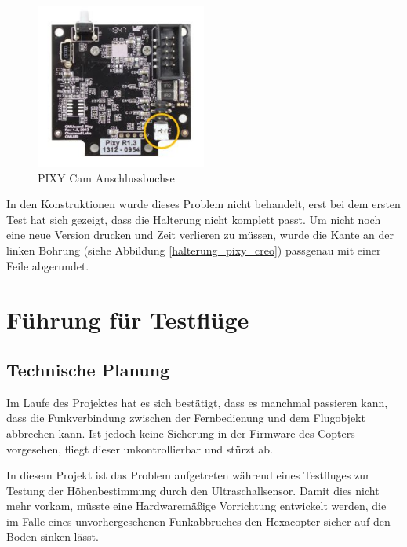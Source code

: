 			\begin{figure}[H]
			\begin{centering}
			\includegraphics[width = 0.5\textwidth]{Bilder/PIXY_Cam_Hinterseite}
			\par\end{centering}
			\caption[PIXY Cam Anschlussbuchse]{PIXY Cam Anschlussbuchse\cite{PIXY_Cmu_cam5}}
			\label{PIXY_Cam_Hinterseite}
			\end{figure}

	In den Konstruktionen wurde dieses Problem nicht behandelt, erst bei dem ersten Test hat sich gezeigt, dass die Halterung nicht komplett passt.
	Um nicht noch eine neue Version drucken und Zeit verlieren zu müssen, wurde die Kante an der linken Bohrung (siehe Abbildung \ref{halterung_pixy_creo}) passgenau mit einer Feile abgerundet.

			\newpage

\section{Führung für Testflüge}

	\subsection{Technische Planung}

	Im Laufe des Projektes hat es sich bestätigt, dass es manchmal passieren kann, dass die Funkverbindung zwischen der Fernbedienung und dem Flugobjekt abbrechen kann.
	Ist jedoch keine Sicherung in der Firmware des Copters vorgesehen, fliegt dieser unkontrollierbar und stürzt ab.

	In diesem Projekt ist das Problem aufgetreten während eines Testfluges zur Testung der Höhenbestimmung durch den Ultraschallsensor.
	Damit dies nicht mehr vorkam, müsste eine Hardwaremäßige Vorrichtung entwickelt werden, die im Falle eines unvorhergesehenen Funkabbruches den Hexacopter sicher auf den Boden sinken lässt.

